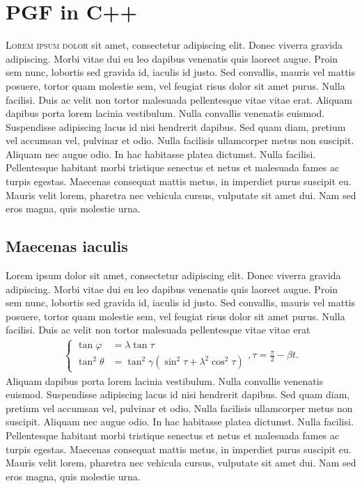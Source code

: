 \chapter{PGF in C++}
\lettrine[lines=4, loversize=-0.1, lraise=0.1]{L}{orem ipsum dolor} sit amet, consectetur adipiscing elit. Donec viverra gravida adipiscing. Morbi vitae dui eu leo dapibus venenatis quis laoreet augue. Proin sem nunc, lobortis sed gravida id, iaculis id justo. Sed convallis, mauris vel mattis posuere, tortor quam molestie sem, vel feugiat risus dolor sit amet purus. Nulla facilisi. Duis ac velit non tortor malesuada pellentesque vitae vitae erat. Aliquam dapibus porta lorem lacinia vestibulum. Nulla convallis venenatis euismod. Suspendisse adipiscing lacus id nisi hendrerit dapibus. Sed quam diam, pretium vel accumsan vel, pulvinar et odio. Nulla facilisis ullamcorper metus non suscipit. Aliquam nec augue odio. In hac habitasse platea dictumst. Nulla facilisi. Pellentesque habitant morbi tristique senectus et netus et malesuada fames ac turpis egestas. Maecenas consequat mattis metus, in imperdiet purus suscipit eu. Mauris velit lorem, pharetra nec vehicula cursus, vulputate sit amet dui. Nam sed eros magna, quis molestie urna.
\section{Maecenas iaculis}
Lorem ipsum dolor sit amet, consectetur adipiscing elit. Donec viverra gravida adipiscing. Morbi vitae dui eu leo dapibus venenatis quis laoreet augue. Proin sem nunc, lobortis sed gravida id, iaculis id justo. Sed convallis, mauris vel mattis posuere, tortor quam molestie sem, vel feugiat risus dolor sit amet purus. Nulla facilisi. Duis ac velit non tortor malesuada pellentesque vitae vitae erat
\begin{gather*}
\left\{\begin{split}
\tan \varphi &= \lambda \tan \tau \\
\tan^2 \theta &= \tan^2 \gamma (\sin^2\tau + \lambda^2 \cos^2\tau)
\end{split}\right., \tau = \frac{\pi}{2}-\beta t.
\end{gather*}
Aliquam dapibus porta lorem lacinia vestibulum. Nulla convallis venenatis euismod. Suspendisse adipiscing lacus id nisi hendrerit dapibus. Sed quam diam, pretium vel accumsan vel, pulvinar et odio. Nulla facilisis ullamcorper metus non suscipit. Aliquam nec augue odio. In hac habitasse platea dictumst. Nulla facilisi. Pellentesque habitant morbi tristique senectus et netus et malesuada fames ac turpis egestas. Maecenas consequat mattis metus, in imperdiet purus suscipit eu. Mauris velit lorem, pharetra nec vehicula cursus, vulputate sit amet dui. Nam sed eros magna, quis molestie urna.


